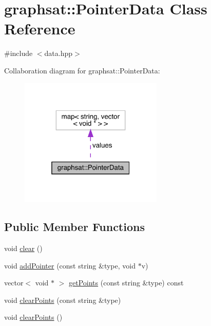 \hypertarget{classgraphsat_1_1_pointer_data}{}\section{graphsat\+::Pointer\+Data Class Reference}
\label{classgraphsat_1_1_pointer_data}


{\ttfamily \#include $<$data.\+hpp$>$}



Collaboration diagram for graphsat\+::Pointer\+Data\+:\nopagebreak
\begin{figure}[H]
\begin{center}
\leavevmode
\includegraphics[width=193pt]{classgraphsat_1_1_pointer_data__coll__graph}
\end{center}
\end{figure}
\subsection*{Public Member Functions}
\begin{DoxyCompactItemize}
\item 
void \mbox{\hyperlink{classgraphsat_1_1_pointer_data_ad550598884f265fc41845f2818070422}{clear}} ()
\item 
void \mbox{\hyperlink{classgraphsat_1_1_pointer_data_ad4e7d9f0c58993ce58b06c0bd9e0cb1f}{add\+Pointer}} (const string \&type, void $\ast$v)
\item 
vector$<$ void $\ast$ $>$ \mbox{\hyperlink{classgraphsat_1_1_pointer_data_a5a5b4d08a9a16220e22e244c45f320bd}{get\+Points}} (const string \&type) const
\item 
void \mbox{\hyperlink{classgraphsat_1_1_pointer_data_ac609e904c48f7cc8b136eb5208bd5ffe}{clear\+Points}} (const string \&type)
\item 
void \mbox{\hyperlink{classgraphsat_1_1_pointer_data_a2ccca7ec8ce9b07103b8796a3ed4dfec}{clear\+Points}} ()
\end{DoxyCompactItemize}
